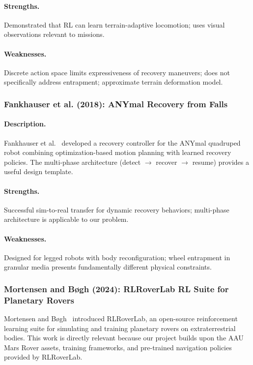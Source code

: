\documentclass[12pt,a4paper]{article}
\begin{document}
\paragraph{Strengths.} Demonstrated that RL can learn terrain-adaptive locomotion; uses visual observations relevant to missions.

\paragraph{Weaknesses.} Discrete action space limits expressiveness of recovery maneuvers; does not specifically address entrapment; approximate terrain deformation model.


\subsubsection{Fankhauser et al. (2018): ANYmal Recovery from Falls}

\paragraph{Description.} Fankhauser et al.~\cite{fankhauser2018} developed a recovery controller for the ANYmal quadruped robot combining optimization-based motion planning with learned recovery policies. The multi-phase architecture (detect $\to$ recover $\to$ resume) provides a useful design template.

\paragraph{Strengths.} Successful sim-to-real transfer for dynamic recovery behaviors; multi-phase architecture is applicable to our problem.

\paragraph{Weaknesses.} Designed for legged robots with body reconfiguration; wheel entrapment in granular media presents fundamentally different physical constraints.


\subsubsection{Mortensen and B\o{}gh (2024): RLRoverLab RL Suite for Planetary Rovers}

Mortensen and Bøgh~\cite{rlroverlab} introduced RLRoverLab, an open-source reinforcement learning suite for simulating and training planetary rovers on extraterrestrial bodies. This work is directly relevant because our project builds upon the AAU Mars Rover assets, training frameworks, and pre-trained navigation policies provided by RLRoverLab.
\end{document}
